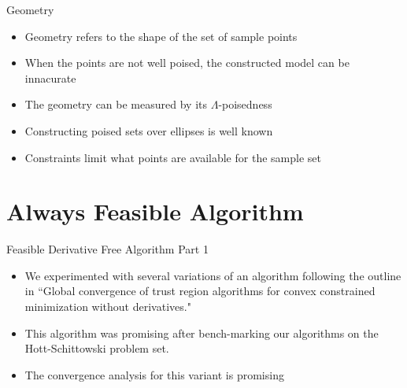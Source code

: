 \documentclass{beamer}
\begin{document}
\begin{frame}{Geometry}
    \begin{itemize}
        \item<1, 2, 3> Geometry refers to the shape of the set of sample points
        \item<1, 2, 3> When the points are not well poised, the constructed model can be innacurate
        \item<3> The geometry can be measured by its $\Lambda$-poisedness
        \item<3> Constructing poised sets over ellipses is well known
        \item<3> Constraints limit what points are available for the sample set
    \end{itemize}
\end{frame}

\begin{frame}

\end{frame}


\section{Always Feasible Algorithm}


\begin{frame}{Feasible Derivative Free Algorithm Part 1}
    \begin{itemize}
        \item We experimented with several variations of an algorithm following the outline in ``Global convergence of trust region algorithms for convex constrained minimization without derivatives."
        \item This algorithm was promising after bench-marking our algorithms on the Hott-Schittowski problem set.
        \item The convergence analysis for this variant is promising
    \end{itemize}
\end{frame}
\end{document}

